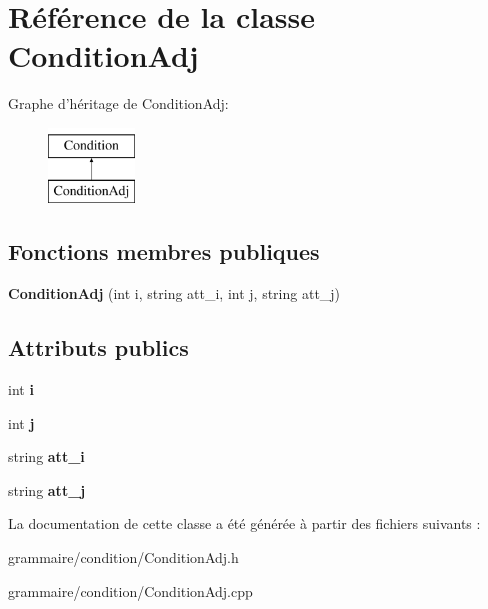 \hypertarget{class_condition_adj}{\section{Référence de la classe Condition\-Adj}
\label{class_condition_adj}
}
Graphe d'héritage de Condition\-Adj\-:\begin{figure}[H]
\begin{center}
\leavevmode
\includegraphics[height=2.000000cm]{class_condition_adj}
\end{center}
\end{figure}
\subsection*{Fonctions membres publiques}
\begin{DoxyCompactItemize}
\item 
\hypertarget{class_condition_adj_a02b8f6ba8554ab86cb1366b1a270de2c}{{\bfseries Condition\-Adj} (int i, string att\-\_\-i, int j, string att\-\_\-j)}\label{class_condition_adj_a02b8f6ba8554ab86cb1366b1a270de2c}

\end{DoxyCompactItemize}
\subsection*{Attributs publics}
\begin{DoxyCompactItemize}
\item 
\hypertarget{class_condition_adj_a337edb2f6c633335a19411a3db31ec36}{int {\bfseries i}}\label{class_condition_adj_a337edb2f6c633335a19411a3db31ec36}

\item 
\hypertarget{class_condition_adj_a00f7ccf764a7733e4c44eac8273abdad}{int {\bfseries j}}\label{class_condition_adj_a00f7ccf764a7733e4c44eac8273abdad}

\item 
\hypertarget{class_condition_adj_a45fa193bbab03993908bf29147cee704}{string {\bfseries att\-\_\-i}}\label{class_condition_adj_a45fa193bbab03993908bf29147cee704}

\item 
\hypertarget{class_condition_adj_a2a43d76fead9c535a4102a67dec08979}{string {\bfseries att\-\_\-j}}\label{class_condition_adj_a2a43d76fead9c535a4102a67dec08979}

\end{DoxyCompactItemize}


La documentation de cette classe a été générée à partir des fichiers suivants \-:\begin{DoxyCompactItemize}
\item 
grammaire/condition/Condition\-Adj.\-h\item 
grammaire/condition/Condition\-Adj.\-cpp\end{DoxyCompactItemize}
